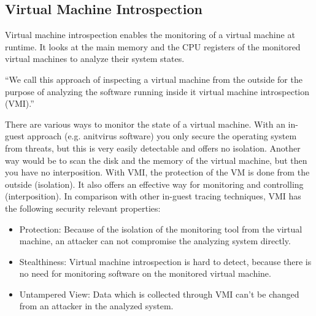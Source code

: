 \documentclass[sigconf]{acmart}
\begin{document}
\subsection{Virtual Machine Introspection}
Virtual machine introspection enables the monitoring of a virtual machine at runtime. It looks at the main memory and the CPU registers of the monitored virtual machines to analyze their system states.
\newline
\begin{definition}
``We call this approach of inspecting a virtual machine from the outside for the purpose of analyzing the software running inside it virtual machine introspection (VMI).'' \cite{garfinkel2003virtual}
\newline
\end{definition}
There are various ways to monitor the state of a virtual machine. With an in-guest approach (e.g. anitvirus software) you only secure the operating system from threats, but this is very easily detectable and offers no isolation. Another way would be to scan the disk and the memory of the virtual machine, but then you have no interposition. With VMI, the protection of the VM is done from the outside (isolation). It also offers an effective way for monitoring and controlling (interposition). 
\newline
\newline
In comparison with other in-guest tracing techniques, VMI has the following security relevant properties:
\newline
\begin{itemize}
	\item Protection: Because of the isolation of the monitoring tool from the virtual machine, an attacker can not compromise the analyzing system directly.
	\newline 
	\item Stealthiness: Virtual machine introspection is hard to detect, because there is no need for monitoring software on the monitored virtual machine. 
	\newline
	\item Untampered View: Data which is collected through VMI can't be changed from an attacker in the analyzed system.
\newline
\end{itemize}
\end{document}
